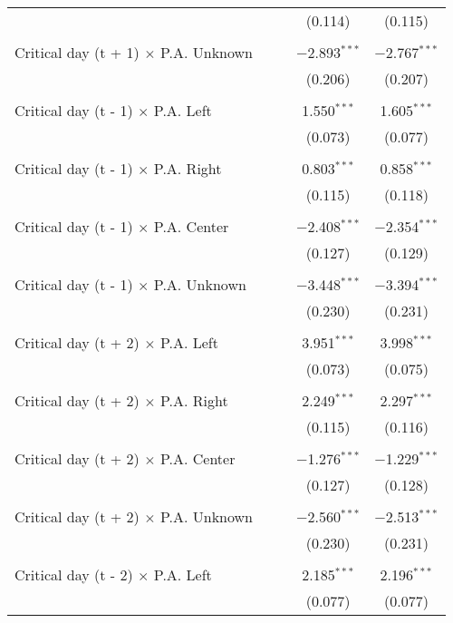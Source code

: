 \documentclass[
]{article}
\begin{document}
\begin{table}[!htbp]
{\begin{tabular}{@{\extracolsep{5pt}}lcccc}
  &  &  & (0.114) & (0.115) \\ 
  & & & & \\ 
 Critical day (t + 1) $\times$ P.A. Unknown &  &  & $-$2.893$^{***}$ & $-$2.767$^{***}$ \\ 
  &  &  & (0.206) & (0.207) \\ 
  & & & & \\ 
 Critical day (t - 1) $\times$ P.A. Left &  &  & 1.550$^{***}$ & 1.605$^{***}$ \\ 
  &  &  & (0.073) & (0.077) \\ 
  & & & & \\ 
 Critical day (t - 1) $\times$ P.A. Right &  &  & 0.803$^{***}$ & 0.858$^{***}$ \\ 
  &  &  & (0.115) & (0.118) \\ 
  & & & & \\ 
 Critical day (t - 1) $\times$ P.A. Center &  &  & $-$2.408$^{***}$ & $-$2.354$^{***}$ \\ 
  &  &  & (0.127) & (0.129) \\ 
  & & & & \\ 
 Critical day (t - 1) $\times$ P.A. Unknown &  &  & $-$3.448$^{***}$ & $-$3.394$^{***}$ \\ 
  &  &  & (0.230) & (0.231) \\ 
  & & & & \\ 
 Critical day (t + 2) $\times$ P.A. Left &  &  & 3.951$^{***}$ & 3.998$^{***}$ \\ 
  &  &  & (0.073) & (0.075) \\ 
  & & & & \\ 
 Critical day (t + 2) $\times$ P.A. Right &  &  & 2.249$^{***}$ & 2.297$^{***}$ \\ 
  &  &  & (0.115) & (0.116) \\ 
  & & & & \\ 
 Critical day (t + 2) $\times$ P.A. Center &  &  & $-$1.276$^{***}$ & $-$1.229$^{***}$ \\ 
  &  &  & (0.127) & (0.128) \\ 
  & & & & \\ 
 Critical day (t + 2) $\times$ P.A. Unknown &  &  & $-$2.560$^{***}$ & $-$2.513$^{***}$ \\ 
  &  &  & (0.230) & (0.231) \\ 
  & & & & \\ 
 Critical day (t - 2) $\times$ P.A. Left &  &  & 2.185$^{***}$ & 2.196$^{***}$ \\ 
  &  &  & (0.077) & (0.077) \\ 

\end{tabular}}
\end{table}
\end{document}
